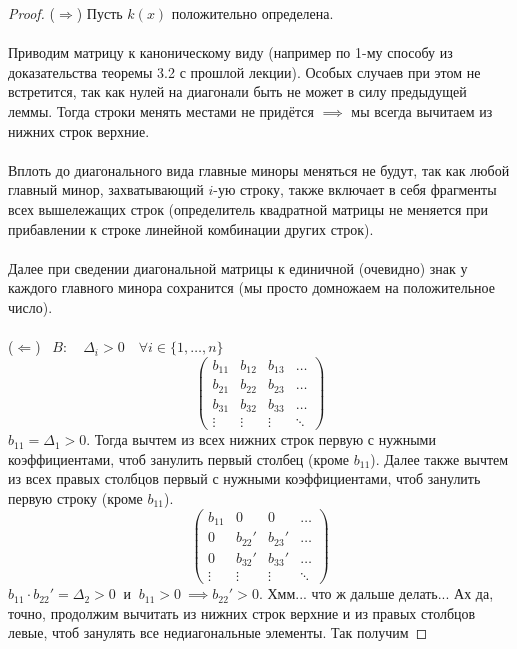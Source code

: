 \documentclass[11pt]{article}
\begin{document}
\begin{proof}
  ($\Longrightarrow$) Пусть $k(x)$ положительно определена. \\ \\
  Приводим матрицу к каноническому виду (например по 1-му способу 
  из доказательства теоремы 3.2 с прошлой лекции). Особых случаев 
  при этом не встретится, так как нулей на диагонали быть не может в 
  силу предыдущей леммы. Тогда строки менять местами не придётся 
  $\implies$ мы всегда вычитаем из нижних строк верхние. \\ \\
  Вплоть до диагонального вида главные миноры меняться не будут, 
  так как любой главный минор, захватывающий $i \text{-ую}$ строку, 
  также включает в себя фрагменты всех вышележащих строк (определитель 
  квадратной матрицы не меняется при прибавлении к строке линейной 
  комбинации других строк). \\ \\
  Далее при сведении диагональной матрицы к единичной (очевидно) знак 
  у каждого главного минора сохранится (мы просто домножаем на 
  положительное число). \\ \\
  ($\Longleftarrow$) \ $B: \quad \Delta_i > 0 \quad 
  \forall i \in \{1, \ldots, n\}$ 
  \[\begin{pmatrix}
    b_{11} & b_{12} & b_{13} & \dots \\
    b_{21} & b_{22} & b_{23} & \dots \\ 
    b_{31} & b_{32} & b_{33} & \dots \\
    \vdots & \vdots & \vdots & \ddots
  \end{pmatrix}\]
  $b_{11} = \Delta_1 > 0$. Тогда вычтем из всех нижних строк первую с 
  нужными коэффициентами, чтоб занулить первый столбец (кроме $b_{11}$). 
  Далее также вычтем из всех правых столбцов первый с нужными 
  коэффициентами, чтоб занулить первую строку (кроме $b_{11}$).
  \[\begin{pmatrix}
    b_{11} & 0 & 0 & \dots \\
    0 & b_{22}' & b_{23}' & \dots \\ 
    0 & b_{32}' & b_{33}' & \dots \\
    \vdots & \vdots & \vdots & \ddots
  \end{pmatrix}\]
  $b_{11} \cdot b_{22}' = \Delta_2 > 0 \ \text{ и } \ b_{11} > 0 \ 
  \implies b_{22}' > 0$. Хмм... что ж дальше делать... Ах да, точно, 
  продолжим вычитать из нижних строк верхние и из правых столбцов 
  левые, чтоб занулять все недиагональные элементы. Так получим 

\end{proof}
\end{document}
